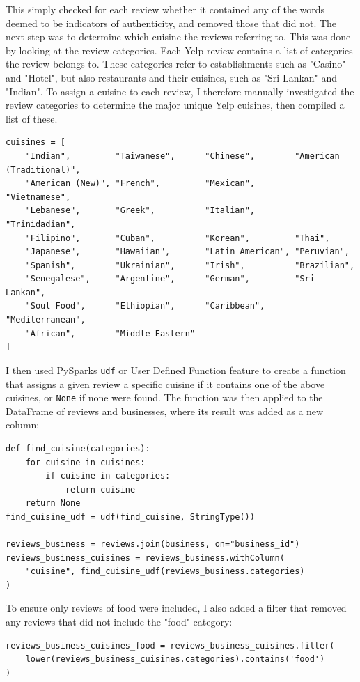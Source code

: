This simply checked for each review whether it contained any of the words deemed to be indicators of authenticity, and removed those that did not. The next step was to determine which cuisine the reviews referring to. This was done by looking at the review categories. Each Yelp review contains a list of categories the review belongs to. These categories refer to establishments such as "Casino" and "Hotel", but also restaurants and their cuisines, such as "Sri Lankan" and "Indian". To assign a cuisine to each review, I therefore manually investigated the review categories to determine the major unique Yelp cuisines, then compiled a list of these.
\begin{verbatim}
cuisines = [
    "Indian",         "Taiwanese",      "Chinese",        "American (Traditional)",
    "American (New)", "French",         "Mexican",        "Vietnamese",
    "Lebanese",       "Greek",          "Italian",        "Trinidadian",
    "Filipino",       "Cuban",          "Korean",         "Thai",
    "Japanese",       "Hawaiian",       "Latin American", "Peruvian",
    "Spanish",        "Ukrainian",      "Irish",          "Brazilian",
    "Senegalese",     "Argentine",      "German",         "Sri Lankan",
    "Soul Food",      "Ethiopian",      "Caribbean",      "Mediterranean",
    "African",        "Middle Eastern"
]
\end{verbatim}
I then used PySparks \texttt{udf} or User Defined Function feature to create a function that assigns a given review a specific cuisine if it contains one of the above cuisines, or \texttt{None} if none were found. The function was then applied to the DataFrame of reviews and businesses, where its result was added as a new column:
\begin{verbatim}
def find_cuisine(categories):
    for cuisine in cuisines:
        if cuisine in categories:
            return cuisine
    return None
find_cuisine_udf = udf(find_cuisine, StringType())

reviews_business = reviews.join(business, on="business_id")
reviews_business_cuisines = reviews_business.withColumn(
    "cuisine", find_cuisine_udf(reviews_business.categories)
)
\end{verbatim}
To ensure only reviews of food were included, I also added a filter that removed any reviews that did not include the "food" category:
\begin{verbatim}
reviews_business_cuisines_food = reviews_business_cuisines.filter(
    lower(reviews_business_cuisines.categories).contains('food')
)
\end{verbatim}

